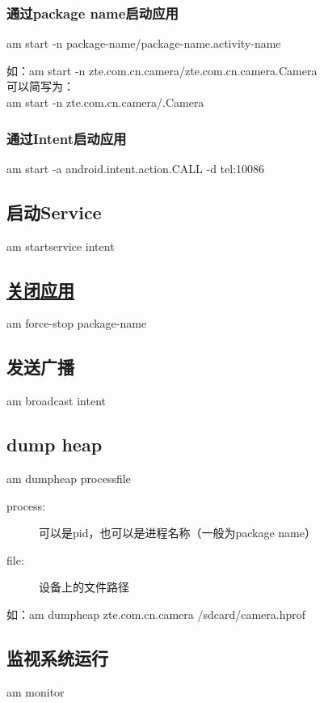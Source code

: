 ﻿\documentclass[a4paper,10pt]{article}
\begin{document}
  \subsubsection[通过package name启动应用]{通过package name启动应用}
  am start -n \lt package-name\gt/\lt package-name.activity-name\gt

  如：am start -n zte.com.cn.camera/zte.com.cn.camera.Camera\\
  可以简写为：\\
  am start -n zte.com.cn.camera/.Camera

  \subsubsection[通过Intent启动应用]{通过Intent启动应用}
  am start -a android.intent.action.CALL -d tel:10086

  \subsection[启动Service]{启动Service}
  am startservice \lt intent\gt

  \subsection[关闭应用]{\underline{关闭应用}}
  am force-stop \lt package-name\gt

  \subsection[发送广播]{发送广播}
  am broadcast \lt intent\gt

  \subsection[dump heap]{dump heap}
  am dumpheap \lt process\gt \lt file\gt

  \begin{description}
    \item[process:] 可以是pid，也可以是进程名称（一般为package name）
    \item[file:] 设备上的文件路径
  \end{description}
  如：am dumpheap zte.com.cn.camera /sdcard/camera.hprof

  \subsection[监视系统运行]{监视系统运行}
  am monitor
\end{document}
